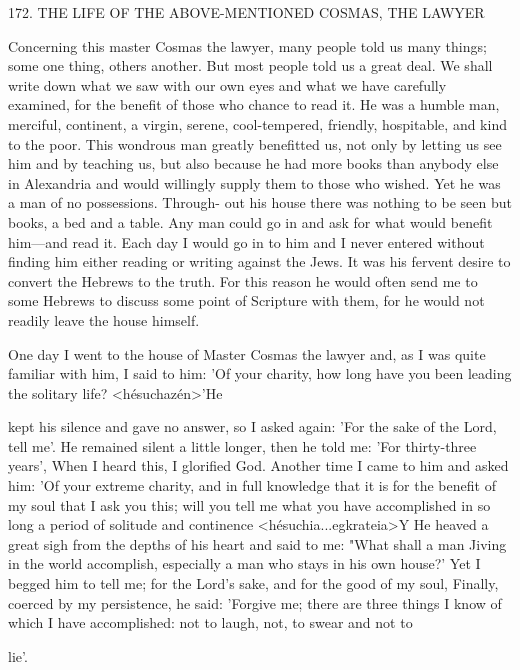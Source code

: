 172. THE LIFE OF THE ABOVE-MENTIONED
COSMAS, THE LAWYER

Concerning this master Cosmas the lawyer, many people told us
many things; some one thing, others another. But most people told
us a great deal. We shall write down what we saw with our own
eyes and what we have carefully examined, for the benefit of those
who chance to read it. He was a humble man, merciful, continent,
a virgin, serene, cool-tempered, friendly, hospitable, and kind to the
poor. This wondrous man greatly benefitted us, not only by letting
us see him and by teaching us, but also because he had more books
than anybody else in Alexandria and would willingly supply them
to those who wished. Yet he was a man of no possessions. Through-
out his house there was nothing to be seen but books, a bed and a
table. Any man could go in and ask for what would benefit
him—and read it. Each day I would go in to him and I never
entered without finding him either reading or writing against the
Jews. It was his fervent desire to convert the Hebrews to the truth.
For this reason he would often send me to some Hebrews to discuss
some point of Scripture with them, for he would not readily leave
the house himself.

One day I went to the house of Master Cosmas the lawyer and,
as I was quite familiar with him, I said to him: 'Of your charity,
how long have you been leading the solitary life? <hésuchazén>'He

kept his silence and gave no answer, so I asked again: 'For the sake
of the Lord, tell me'. He remained silent a little longer, then he told
me: 'For thirty-three years', When I heard this, I glorified God.
Another time I came to him and asked him: 'Of your extreme
charity, and in full knowledge that it is for the benefit of my soul
that I ask you this; will you tell me what you have accomplished in
so long a period of solitude and continence <hésuchia...egkrateia>Y
He heaved a great sigh from the depths of his heart and said to me:
"What shall a man Jiving in the world accomplish, especially a man
who stays in his own house?' Yet I begged him to tell me; for the
Lord's sake, and for the good of my soul, Finally, coerced by my
persistence, he said: 'Forgive me; there are three things I know of
which I have accomplished: not to laugh, not, to swear and not to

lie'.

